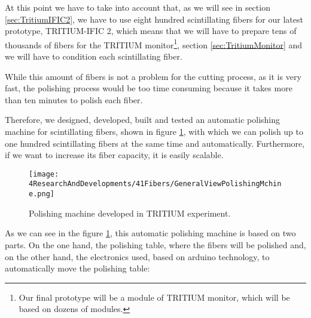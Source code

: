 At this point we have to take into account that, as we will see in section \ref{sec:TritiumIFIC2}, we have to use eight hundred scintillating fibers for our latest prototype, TRITIUM-IFIC 2, which means that we will have to prepare tens of thousands of fibers for the TRITIUM monitor\footnote{Our final prototype will be a module of TRITIUM monitor, which will be based on dozens of modules.}, section \ref{sec:TritiumMonitor} and we will have to condition each scintillating fiber.

While this amount of fibers is not a problem for the cutting process, as it is very fast, the polishing process would be too time consuming because it takes more than ten minutes to polish each fiber. 

Therefore, we designed, developed, built and tested an automatic polishing machine for scintillating fibers, shown in figure \ref{fig:GeneralViewPolishingMachine}, with which we can polish up to one hundred scintillating fibers at the same time and automatically. Furthermore, if we want to increase its fiber capacity, it is easily scalable.


\begin{figure}[h]
\centering
\texttt{[image: 4ResearchAndDevelopments/41Fibers/GeneralViewPolishingMchine.png]}
\caption{Polishing machine developed in TRITIUM experiment.\label{fig:GeneralViewPolishingMachine}}
\end{figure}

As we can see in the figure \ref{fig:GeneralViewPolishingMachine}, this automatic polishing machine is based on two parts. On the one hand, the polishing table, where the fibers will be polished and, on the other hand, the electronics used, based on arduino technology, to automatically move the polishing table:

